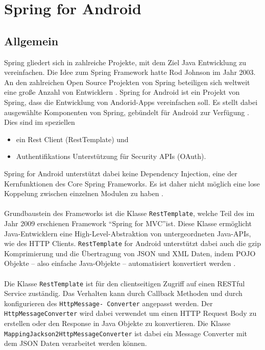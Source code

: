 \newpage
\section{Spring for Android}

\subsection{Allgemein}
Spring gliedert sich in zahlreiche Projekte, mit dem Ziel Java Entwicklung zu vereinfachen. Die Idee zum Spring Framework hatte Rod Johnson im Jahr 2003. An den zahlreichen Open Source Projekten von Spring  beteiligen sich weltweit eine große Anzahl von Entwicklern \cite{springITWissen}. Spring for Android ist ein Projekt von Spring, dass die Entwicklung von Andorid-Apps vereinfachen soll. Es stellt dabei ausgewählte Komponenten von Spring, gebündelt für Android zur Verfügung \cite{springForAndroid:website}. Dies sind im speziellen 

\begin{itemize}
	\item ein Rest Client (RestTemplate) und
	\item Authentifikations Unterstützung für Security APIs (OAuth).
\end{itemize}

Spring for Android unterstützt dabei keine Dependency Injection, eine der Kernfunktionen des Core Spring Frameworks. Es ist daher nicht möglich eine lose Koppelung zwischen einzelnen Modulen zu haben \cite{springForAndroid:dahanne}.
\\\\
Grundbaustein des Frameworks ist die Klasse \texttt{RestTemplate}, welche Teil des im Jahr 2009 erschienen Framework \textquotedblleft Spring for MVC\textquotedblright ist. Diese Klasse ermöglicht Java-Entwicklern eine High-Level-Abstraktion von untergeordneten Java-APIs, wie des HTTP Clients. \texttt{RestTemplate} for Android unterstützt dabei auch die gzip Komprimierung und die Übertragung von \acrfull{JSON} und \acrfull{XML} Daten, indem \acrfull{POJO} Objekte  – also einfache Java-Objekte – automatisiert konvertiert werden \cite{springForAndroid:dahanne}.
\\\\
Die Klasse \texttt{RestTemplate} ist für den clientseitigen Zugriff auf einen RESTful Service zuständig. Das Verhalten kann durch Callback Methoden und durch konfigurieren des \texttt{HttpMessage- Converter} angepasst werden. Der \texttt{HttpMessageConverter} wird dabei verwendet um einen HTTP Request Body zu erstellen oder den Response in Java Objekte zu konvertieren. Die Klasse \texttt{MappingJackson2HttpMessageConverter} ist dabei ein Message Converter mit dem JSON Daten verarbeitet werden können.

